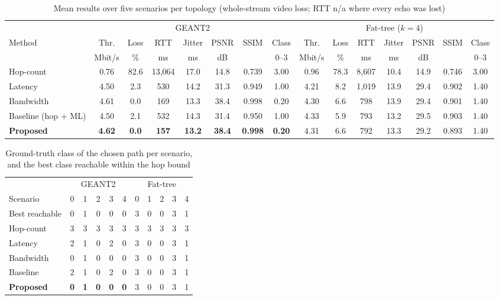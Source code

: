 \documentclass[conference,a4paper]{IEEEtran}
\begin{document}
\begin{table}[t]
\centering
\caption{Mean results over five scenarios per topology (whole-stream video loss; RTT n/a where every echo was lost)}
\label{tab:results}
\footnotesize
\setlength{\tabcolsep}{3.4pt}
\begin{tabular}{@{}l ccccccc ccccccc@{}}
\toprule
& \multicolumn{7}{c}{GEANT2} & \multicolumn{7}{c}{Fat-tree ($k=4$)} \\
\cmidrule(lr){2-8}\cmidrule(l){9-15}
Method & Thr. & Loss & RTT & Jitter & PSNR & SSIM & Class & Thr. & Loss & RTT & Jitter & PSNR & SSIM & Class \\
& Mbit/s & \% & ms & ms & dB & & 0--3 & Mbit/s & \% & ms & ms & dB & & 0--3 \\
\midrule
Hop-count & 0.76 & 82.6 & 13,064 & 17.0 & 14.8 & 0.739 & 3.00 & 0.96 & 78.3 & 8,607 & 10.4 & 14.9 & 0.746 & 3.00 \\
Latency & 4.50 & 2.3 & 530 & 14.2 & 31.3 & 0.949 & 1.00 & 4.21 & 8.2 & 1,019 & 13.9 & 29.4 & 0.902 & 1.40 \\
Bandwidth & 4.61 & 0.0 & 169 & 13.3 & 38.4 & 0.998 & 0.20 & 4.30 & 6.6 & 798 & 13.9 & 29.4 & 0.901 & 1.40 \\
Baseline (hop + ML) & 4.50 & 2.1 & 532 & 14.3 & 31.4 & 0.950 & 1.00 & 4.33 & 5.9 & 793 & 13.2 & 29.5 & 0.903 & 1.40 \\
\textbf{Proposed} & \textbf{4.62} & \textbf{0.0} & \textbf{157} & \textbf{13.2} & \textbf{38.4} & \textbf{0.998} & \textbf{0.20} & 4.31 & 6.6 & 792 & 13.3 & 29.2 & 0.893 & 1.40 \\
\bottomrule
\end{tabular}
\end{table}

\begin{table}[t]
\centering
\caption{Ground-truth class of the chosen path per scenario, and the best class reachable within the hop bound}
\label{tab:oracle}
\footnotesize
\setlength{\tabcolsep}{3.4pt}
\begin{tabular}{@{}lccccc ccccc@{}}
\toprule
& \multicolumn{5}{c}{GEANT2} & \multicolumn{5}{c}{Fat-tree} \\
\cmidrule(lr){2-6}\cmidrule(l){7-11}
Scenario & 0 & 1 & 2 & 3 & 4 & 0 & 1 & 2 & 3 & 4 \\
\midrule
Best reachable & 0 & 1 & 0 & 0 & 0 & 3 & 0 & 0 & 3 & 1 \\
\midrule
Hop-count & 3 & 3 & 3 & 3 & 3 & 3 & 3 & 3 & 3 & 3 \\
Latency & 2 & 1 & 0 & 2 & 0 & 3 & 0 & 0 & 3 & 1 \\
Bandwidth & 0 & 1 & 0 & 0 & 0 & 3 & 0 & 0 & 3 & 1 \\
Baseline & 2 & 1 & 0 & 2 & 0 & 3 & 0 & 0 & 3 & 1 \\
\textbf{Proposed} & \textbf{0} & \textbf{1} & \textbf{0} & \textbf{0} & \textbf{0} & 3 & 0 & 0 & 3 & 1 \\
\bottomrule
\end{tabular}
\end{table}
\end{document}
